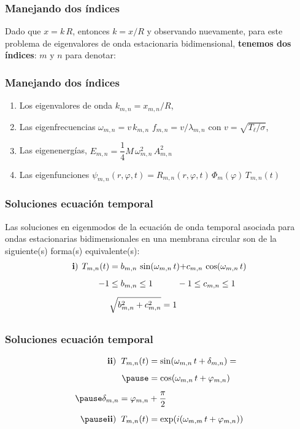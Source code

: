\documentclass[12pt]{beamer}
\begin{document}
\begin{frame}
\frametitle{Manejando dos índices}
Dado que $x = k \, R$, entonces $k = x / R$ y observando nuevamente, para este problema de eigenvalores de onda estacionaria bidimensional, \textbf{tenemos dos índices}: $m$ y $n$ para denotar:
\end{frame}
\begin{frame}
\frametitle{Manejando dos índices}
\begin{enumerate}[<+->]
\item Los eigenvalores de onda $k_{m, n}= x_{m, n} / R$,
\item Las eigenfrecuencias $\omega_{m, n}  = v \, k_{m, n}$  $f_{m, n} = v / \lambda_{m, n}$ con $v = \sqrt{T_{\ell} / \sigma}$,
\item Las eigenenergías, $E_{m, n} = \dfrac{1}{4} M \, \omega_{m, n}^{2} \, A_{m, n}^{2}$
\item Las eigenfunciones $\psi_{m, n} (r, \varphi, t) = R_{m,n} (r, \varphi, t) \, \Phi_{m} (\varphi) \, T_{m, n} (t)$
\end{enumerate}
\end{frame}
\begin{frame}
\frametitle{Soluciones ecuación temporal}
Las soluciones en eigenmodos de la ecuación de onda temporal asociada para ondas estacionarias bidimensionales en una membrana circular son de la siguiente(s) forma(s) equivalente(s):
\pause
\begin{align*}
\mathbf{i)} \hspace{0.15cm} T_{m,n} (t) &= b_{m,n} \, \sin (\omega_{m,n} \, t) {+} c_{m,n} \, \cos (\omega_{m,n} \, t) \\[0.5em]
-1 &\leq b_{m,n} \leq 1 \hspace{1cm} -1 \leq c_{m,n} \leq 1 \\[0.5em]
&\sqrt{b_{m,n}^{2} + c_{m,n}^{2}} = 1 \\[0.5em]
\end{align*}
\end{frame}
\begin{frame}
\frametitle{Soluciones ecuación temporal}
\begin{eqnarray*}
\begin{aligned}
\mathbf{ii)} \hspace{0.2cm} T_{m,n} (t) &= \sin (\omega_{m,n} \, t + \delta_{m,n}) = \\[0.5em] \pause
&= \cos(\omega_{m,n} \, t + \varphi_{m,n}) \\[0.5em] \pause
\delta_{m,n} = \varphi_{m,n} &+ \dfrac{\pi}{2} \\[0.5em] \pause
\mathbf{ii)} \hspace{0.2cm} T_{m,n} (t) &= \exp(i(\omega_{m,m} \, t + \varphi_{m,n}))
\end{aligned}
\end{eqnarray*}
\end{frame}
\end{document}
